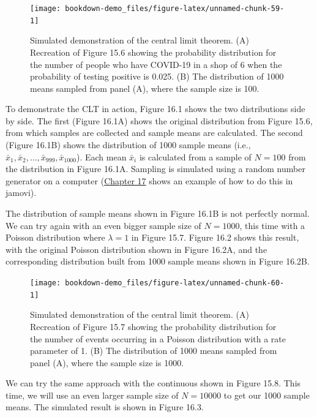\documentclass[
  openany]{krantz}
\begin{document}
\begin{figure}
\texttt{[image: bookdown-demo\_files/figure-latex/unnamed-chunk-59-1]} \caption{Simulated demonstration of the central limit theorem. (A) Recreation of Figure 15.6 showing the probability distribution for the number of people who have COVID-19 in a shop of 6 when the probability of testing positive is 0.025. (B) The distribution of 1000 means sampled from panel (A), where the sample size is 100.}\label{fig:unnamed-chunk-59}
\end{figure}

To demonstrate the CLT in action, Figure 16.1 shows the two distributions side by side.
The first (Figure 16.1A) shows the original distribution from Figure 15.6, from which samples are collected and sample means are calculated.
The second (Figure 16.1B) shows the distribution of 1000 sample means (i.e., \(\bar{x}_{1}, \bar{x}_{2}, ..., \bar{x}_{999}, \bar{x}_{1000}\)).
Each mean \(\bar{x}_{i}\) is calculated from a sample of \(N = 100\) from the distribution in Figure 16.1A.
Sampling is simulated using a random number generator on a computer (\protect\hyperlink{Chapter_17}{Chapter 17} shows an example of how to do this in jamovi).

\newpage

The distribution of sample means shown in Figure 16.1B is not perfectly normal.
We can try again with an even bigger sample size of \(N = 1000\), this time with a Poisson distribution where \(\lambda = 1\) in Figure 15.7.
Figure 16.2 shows this result, with the original Poisson distribution shown in Figure 16.2A, and the corresponding distribution built from 1000 sample means shown in Figure 16.2B.

\begin{figure}
\texttt{[image: bookdown-demo\_files/figure-latex/unnamed-chunk-60-1]} \caption{Simulated demonstration of the central limit theorem. (A) Recreation of Figure 15.7 showing the probability distribution for the number of events occurring in a Poisson distribution with a rate parameter of 1. (B) The distribution of 1000 means sampled from panel (A), where the sample size is 1000.}\label{fig:unnamed-chunk-60}
\end{figure}

We can try the same approach with the continuous  shown in Figure 15.8.
This time, we will use an even larger sample size of \(N = 10000\) to get our 1000 sample means.
The simulated result is shown in Figure 16.3.
\end{document}
